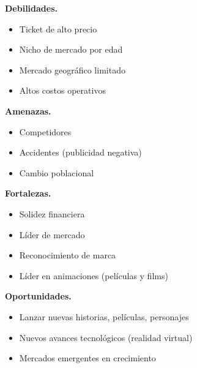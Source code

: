 \documentclass[a4paper]{article}
\begin{document}
    \begin{figure}[ht] 
        \label{DAFO} 
        \begin{minipage}[b]{0.5\linewidth}
          \centering

          \textbf{Debilidades.}
          \begin{itemize}
              \item Ticket de alto precio
              \item Nicho de mercado por edad
              \item Mercado geográfico limitado
              \item Altos costos operativos
          \end{itemize}

          \vspace{4ex}
        \end{minipage}%
        \begin{minipage}[b]{0.5\linewidth}
          \centering
          
          \textbf{Amenazas.}
\begin{itemize}
    \item Competidores
    \item Accidentes (publicidad negativa)
    \item Cambio poblacional
\end{itemize}

          \vspace{4ex}
        \end{minipage} 
        \begin{minipage}[b]{0.5\linewidth}
          \centering
          
          \textbf{Fortalezas.}
\begin{itemize}
    \item Solidez financiera
    \item Líder de mercado
    \item Reconocimiento de marca
    \item Líder en animaciones (películas y films)
\end{itemize}

          \vspace{4ex}
        \end{minipage}%
        \begin{minipage}[b]{0.5\linewidth}
          \centering
          
          \textbf{Oportunidades.}
\begin{itemize}
    \item Lanzar nuevas historias, películas, personajes
    \item Nuevos avances tecnológicos (realidad virtual)
    \item Mercados emergentes en crecimiento
\end{itemize}

          \vspace{4ex}
    \end{minipage} 
\end{figure}








{}
\end{document}
